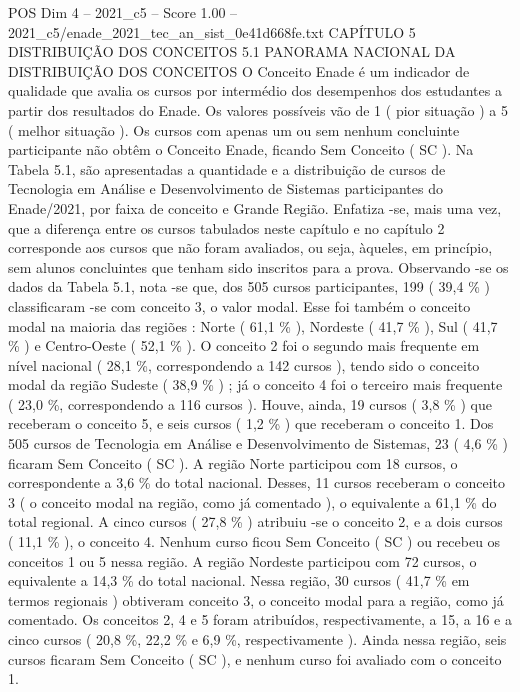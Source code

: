 \begin{textsample}{POS Dim 4 – 2021\_c5 – Score 1.00 – 2021\_c5/enade\_2021\_tec\_an\_sist\_0e41d668fe.txt}  \label{ex:f4_pos_212}
CAPÍTULO 5 DISTRIBUIÇÃO DOS CONCEITOS 5.1 PANORAMA NACIONAL DA DISTRIBUIÇÃO DOS CONCEITOS O Conceito Enade é um indicador de qualidade que avalia os cursos por intermédio dos desempenhos dos estudantes a partir dos resultados do Enade.
Os valores possíveis vão de 1 ( pior situação ) a 5 ( melhor situação ).
Os cursos com apenas um ou sem nenhum concluinte participante não obtêm o Conceito Enade, ficando Sem Conceito ( SC ).
Na Tabela 5.1, são apresentadas a quantidade e a distribuição de cursos de Tecnologia em Análise e Desenvolvimento de Sistemas participantes do Enade/2021, por faixa de conceito e Grande Região.
Enfatiza -se, mais uma vez, que a diferença entre os cursos tabulados neste capítulo e no capítulo 2 corresponde aos cursos que não foram avaliados, ou seja, àqueles, em princípio, sem alunos concluintes que tenham sido inscritos para a prova.
Observando -se os dados da Tabela 5.1, nota -se que, dos 505 cursos participantes, 199 ( 39,4 \% ) classificaram -se com conceito 3, o valor modal.
Esse foi também o conceito modal na maioria das regiões : Norte ( 61,1 \% ), Nordeste ( 41,7 \% ), Sul ( 41,7 \% ) e Centro-Oeste ( 52,1 \% ).
O conceito 2 foi o segundo mais frequente em nível nacional ( 28,1 \%, correspondendo a 142 cursos ), tendo sido o conceito modal da região Sudeste ( 38,9 \% ) ; já o conceito 4 foi o terceiro mais frequente ( 23,0 \%, correspondendo a 116 cursos ).
Houve, ainda, 19 cursos ( 3,8 \% ) que receberam o conceito 5, e seis cursos ( 1,2 \% ) que receberam o conceito 1.
Dos 505 cursos de Tecnologia em Análise e Desenvolvimento de Sistemas, 23 ( 4,6 \% ) ficaram Sem Conceito ( SC ).
A região Norte participou com 18 cursos, o correspondente a 3,6 \% do total nacional.
Desses, 11 cursos receberam o conceito 3 ( o conceito modal na região, como já comentado ), o equivalente a 61,1 \% do total regional.
A cinco cursos ( 27,8 \% ) atribuiu -se o conceito 2, e a dois cursos ( 11,1 \% ), o conceito 4.
Nenhum curso ficou Sem Conceito ( SC ) ou recebeu os conceitos 1 ou 5 nessa região.
A região Nordeste participou com 72 cursos, o equivalente a 14,3 \% do total nacional.
Nessa região, 30 cursos ( 41,7 \% em termos regionais ) obtiveram conceito 3, o conceito modal para a região, como já comentado.
Os conceitos 2, 4 e 5 foram atribuídos, respectivamente, a 15, a 16 e a cinco cursos ( 20,8 \%, 22,2 \% e 6,9 \%, respectivamente ).
Ainda nessa região, seis cursos ficaram Sem Conceito ( SC ), e nenhum curso foi avaliado com o conceito 1.

\end{textsample}
